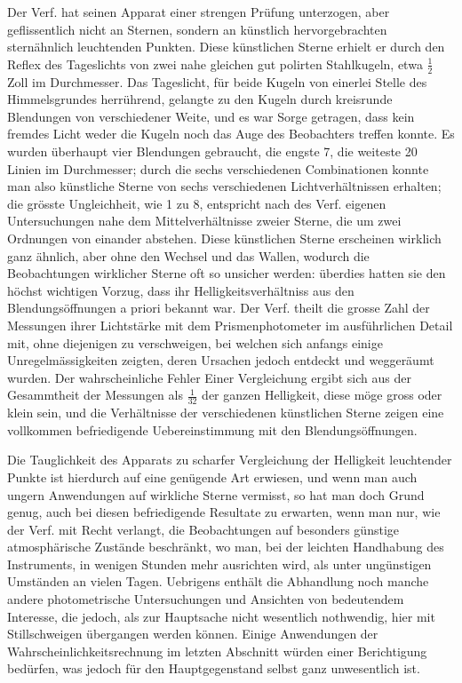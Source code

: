 Der Verf. hat seinen Apparat einer strengen Prüfung unterzogen, aber geflissentlich nicht an
Sternen, sondern an künstlich hervorgebrachten sternähnlich leuchtenden Punkten. Diese künstlichen
Sterne erhielt er durch den Reflex des Tageslichts von zwei nahe gleichen gut polirten Stahlkugeln,
etwa $\frac{1}{2}$ Zoll im Durchmesser. Das Tageslicht, für beide Kugeln von einerlei Stelle des
Himmelsgrundes herrührend, gelangte zu den Kugeln durch kreisrunde Blendungen von verschiedener
Weite, und es war Sorge getragen, dass kein fremdes Licht weder die Kugeln noch das Auge des
Beobachters treffen konnte. Es wurden überhaupt vier Blendungen gebraucht, die engste 7, die
weiteste 20 Linien im Durchmesser; durch die sechs verschiedenen Combinationen konnte man also
künstliche Sterne von sechs verschiedenen Lichtverhältnissen erhalten; die grösste Ungleichheit,
wie 1 zu 8, entspricht nach des Verf. eigenen Untersuchungen nahe dem Mittelverhältnisse zweier
Sterne, die um zwei Ordnungen von einander abstehen. Diese künstlichen Sterne erscheinen wirklich
ganz ähnlich, aber ohne den Wechsel und das Wallen, wodurch die Beobachtungen wirklicher Sterne
oft so unsicher werden: überdies hatten sie den höchst wichtigen Vorzug, dass ihr
Helligkeitsverhältniss aus den Blendungsöffnungen a priori bekannt war. Der Verf. theilt die
grosse Zahl der Messungen ihrer Lichtstärke mit dem Prismenphotometer im ausführlichen Detail mit,
ohne diejenigen zu verschweigen, bei welchen sich anfangs einige Unregelmässigkeiten zeigten, deren
Ursachen jedoch entdeckt und weggeräumt wurden. Der wahrscheinliche Fehler Einer Vergleichung
ergibt sich aus der Gesammtheit der Messungen als $\frac{1}{32}$
der ganzen Helligkeit, diese möge gross oder klein sein, und die Verhältnisse der verschiedenen
künstlichen Sterne zeigen eine vollkommen befriedigende Uebereinstimmung mit den
Blendungsöffnungen.

Die Tauglichkeit des Apparats zu scharfer Vergleichung der Helligkeit leuchtender Punkte ist
hierdurch auf eine genügende Art erwiesen, und wenn man auch ungern Anwendungen auf wirkliche
Sterne vermisst, so hat man doch Grund genug, auch bei diesen befriedigende Resultate zu erwarten,
wenn man nur, wie der Verf. mit Recht verlangt, die Beobachtungen auf besonders günstige
atmosphärische Zustände beschränkt, wo man, bei der leichten Handhabung des Instruments, in
wenigen Stunden mehr ausrichten wird, als unter ungünstigen Umständen an vielen Tagen. Uebrigens
enthält die Abhandlung noch manche andere photometrische Untersuchungen und Ansichten von
bedeutendem Interesse, die jedoch, als zur Hauptsache nicht wesentlich nothwendig, hier mit
Stillschweigen übergangen werden können. Einige Anwendungen der Wahrscheinlichkeitsrechnung im
letzten Abschnitt würden einer Berichtigung bedürfen, was jedoch für den Hauptgegenstand selbst
ganz unwesentlich ist.

